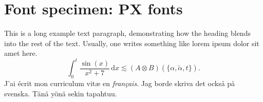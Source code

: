 \documentclass[11pt]{report}
\begin{document}
\section*{Font specimen: PX fonts}
This is a long example text paragraph,
demonstrating how the heading blends into the rest of the text.
Usually, one writes something like lorem ipsum dolor sit amet here.
\[
\int_0^t \frac{\sin(x)}{x^2 + 7} \,\mathrm dx
\lesssim (A \otimes B)(\{ \alpha, \tilde\alpha, t \}).
\]
J'ai écrit mon curriculum vit\ae{} en \emph{fran\c{c}ais}.
Jag borde skriva det också på svenska.
Tänä yönä sekin tapahtuu.
\end{document}
